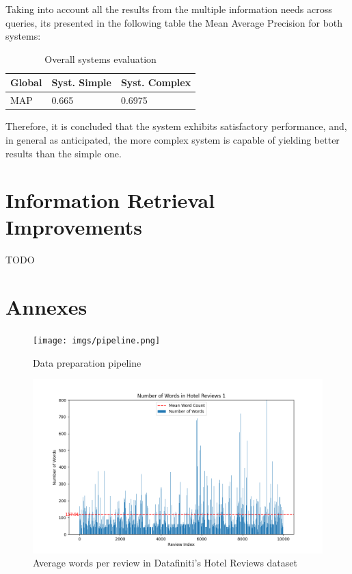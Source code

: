 \documentclass[sigconf]{acmart}
\begin{document}
Taking into account all the results from the multiple information needs across queries, its presented in the following table the Mean Average Precision for both systems:

\begin{table}[h]
\caption{Overall systems evaluation}
\label{tab:systems_ev}
\begin{tabular}{lll}
\toprule
Global & Syst. Simple & Syst. Complex\\
\midrule
MAP & 0.665 & 0.6975  \\

\bottomrule
\end{tabular}
\end{table}

Therefore, it is concluded that the system exhibits satisfactory performance, and, in general as anticipated, the more complex system is capable of yielding better results than the simple one.

\renewcommand{\thesubsection}{\arabic{section}.\arabic{subsection}}
\section{Information Retrieval Improvements} \label{sec:improvements}

TODO

\nocite{*}
\def\BibTex{BibTeX}


\appendix

\section{Annexes}

\begin{figure}[H]
  \centering
  \texttt{[image: imgs/pipeline.png]}
  \caption{Data preparation pipeline}
  \label{fig:pipeline}
\end{figure}

\begin{figure}[h]
  \centering
  \includegraphics[width=\linewidth]{imgs/word_count_1.png}
  \caption{Average words per review in Datafiniti's Hotel Reviews dataset}
  \label{fig:reviewWords1}
\end{figure}
\end{document}
